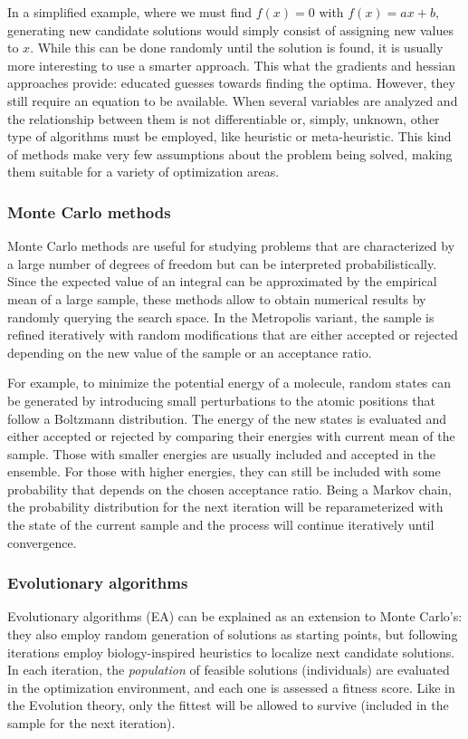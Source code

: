 In a simplified example, where we must find $f(x) = 0$ with $f(x) = ax + b$, generating new candidate solutions would simply consist of assigning new values to $x$. While this can be done randomly until the solution is found, it is usually more interesting to use a smarter approach. This what the gradients and hessian approaches provide: educated guesses towards finding the optima. However, they still require an equation to be available. When several variables are analyzed and the relationship between them is not differentiable or, simply, unknown, other type of algorithms must be employed, like heuristic or meta-heuristic. This kind of methods make very few assumptions about the problem being solved, making them suitable for a variety of optimization areas.

\subsubsection{Monte Carlo methods}

Monte Carlo methods are useful for studying problems that are characterized by a large number of degrees of freedom but can be interpreted probabilistically. Since the expected value of an integral can be approximated by the empirical mean of a large sample, these methods allow to obtain numerical results by randomly querying the search space. In the Metropolis variant, the sample is refined iteratively with random modifications that are either accepted or rejected depending on the new value of the sample or an acceptance ratio.

For example, to minimize the potential energy of a molecule, random states can be generated by introducing small perturbations to the atomic positions that follow a Boltzmann distribution. The energy of the new states is evaluated and either accepted or rejected by comparing their energies with current mean of the sample. Those with smaller energies are usually included and accepted in the ensemble. For those with higher energies, they can still be included with some probability that depends on the chosen acceptance ratio. Being a Markov chain, the probability distribution for the next iteration will be reparameterized with the state of the current sample and the process will continue iteratively until convergence.

\subsubsection{Evolutionary algorithms}
Evolutionary algorithms (EA) can be explained as an extension to Monte Carlo's: they also employ random generation of solutions as starting points, but following iterations employ biology-inspired heuristics to localize next candidate solutions. In each iteration, the \textit{population} of feasible solutions (individuals) are evaluated in the optimization environment, and each one is assessed a fitness score. Like in the Evolution theory, only the fittest will be allowed to survive (included in the sample for the next iteration).

